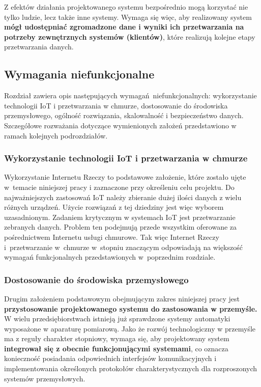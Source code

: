 \documentclass[a4paper, 12pt, twoside]{article}
\begin{document}
Z efektów działania projektowanego systemu bezpośrednio mogą korzystać nie tylko
ludzie, lecz także inne systemy. Wymaga się więc, aby realizowany system \textbf{mógł udostępniać
      zgromadzone dane i wyniki ich przetwarzania na potrzeby zewnętrznych systemów (klientów)},
które realizują kolejne etapy przetwarzania danych.

\subsection{Wymagania niefunkcjonalne}

Rozdział zawiera opis następujących wymagań niefunkcjonalnych:
wykorzystanie technologii IoT i przetwarzania w chmurze, dostosowanie do środowiska
przemysłowego, ogólność rozwiązania, skalowalność i bezpieczeństwo danych. Szczegółowe
rozważania dotyczące wymienionych założeń przedstawiono w ramach kolejnych
podrozdziałów.

\subsubsection{Wykorzystanie technologii IoT i przetwarzania w chmurze}

Wykorzystanie Internetu Rzeczy to podstawowe założenie, które zostało ujęte
w~temacie niniejszej pracy i zaznaczone przy określeniu
celu projektu. Do najważniejszych zastosowań IoT należy zbieranie dużej ilości
danych z wielu różnych urządzeń. Użycie rozwiązań z tej dziedziny jest więc wyborem uzasadnionym.
Zadaniem krytycznym w systemach IoT jest przetwarzanie zebranych danych.
Problem ten podejmują przede wszystkim oferowane za pośrednictwem Internetu
usługi chmurowe. Tak więc Internet Rzeczy i~przetwarzanie w~chmurze w~stopniu
znaczącym odpowiadają na większość wymagań funkcjonalnych przedstawionych w~poprzednim rozdziale.

\subsubsection{Dostosowanie do środowiska przemysłowego}

Drugim założeniem podstawowym obejmującym zakres niniejszej pracy
jest \textbf{przystosowanie projektowanego systemu do zastosowania w przemyśle.}
W wielu przedsiębiorstwach istnieją już sprawdzone systemy automatyki wyposażone
w aparaturę pomiarową. Jako że rozwój technologiczny w przemyśle ma z reguły
charakter stopniowy, wymaga się, aby projektowany system \textbf{integrował się
      z obecnie funkcjonującymi systemami}, co oznacza konieczność posiadania
odpowiednich interfejsów komunikacyjnych i implementowania określonych protokołów
charakterystycznych dla rozproszonych systemów przemysłowych.
\end{document}
